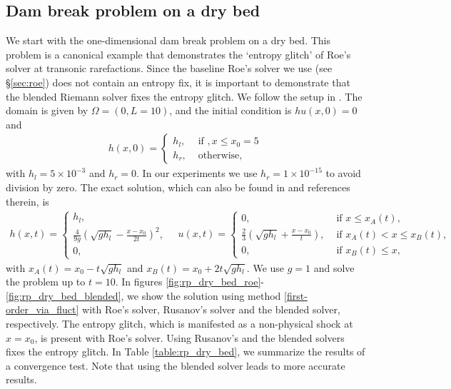\documentclass[preprint, 11pt]{article}
\begin{document}
\subsection{Dam break problem on a dry bed}\label{sec:rp_dry_bed}
We start with the one-dimensional dam break problem on a dry bed.
This problem is a canonical example that demonstrates the `entropy glitch' of Roe's solver
at transonic rarefactions. Since the baseline Roe's solver we use (see \S\ref{sec:roe}) does not contain
an entropy fix, it is important to demonstrate that the blended Riemann solver fixes the entropy glitch.
We follow the setup in \cite[\S 4.1.2]{delestre2013swashes}.
The domain is given by $\Omega=(0,L=10)$, and the initial condition is $hu(x,0)=0$ and
\begin{align*}
  h(x,0)=
  \begin{cases}
    h_l, & \mbox{ if }, x\leq x_0=5 \\
    h_r, &\mbox{ otherwise},
  \end{cases}
\end{align*}
with $h_l=5\times 10^{-3}$ and $h_r=0$. In our experiments we use $h_r=1\times 10^{-15}$ to avoid division by zero.
The exact solution, which can also be found in \cite{delestre2013swashes} and references therein, is
\begin{align*}
  h(x,t) =
  \begin{cases}
    h_l, \\
    \frac{4}{9g}\left(\sqrt{gh_l}-\frac{x-x_0}{2t}\right)^2, \\
    0,
  \end{cases}
\quad
  u(x,t) =
  \begin{cases}
    0, &\mbox{ if } x\leq x_A(t), \\
    \frac{2}{3}\left(\sqrt{gh_l}+\frac{x-x_0}{t}\right), & \mbox{ if } x_A(t) < x\leq x_B(t), \\
    0, &\mbox{ if } x_B(t)\leq x,
  \end{cases}
\end{align*}
with $x_A(t)=x_0-t\sqrt{gh_l}$ and $x_B(t)=x_0+2t\sqrt{gh_l}$.
We use $g=1$ and solve the problem up to $t=10$.
In figures \ref{fig:rp_dry_bed_roe}-\ref{fig:rp_dry_bed_blended},
we show the solution using method \eqref{first-order_via_fluct}
with Roe's solver, Rusanov's solver and the blended solver, respectively.
The entropy glitch, which is manifested as a non-physical shock at $x=x_0$,
is present with Roe's solver. Using Rusanov's and the blended solvers
fixes the entropy glitch.
In Table \ref{table:rp_dry_bed}, we summarize the results of a convergence test.
Note that using the blended solver leads to more accurate results.
\end{document}
